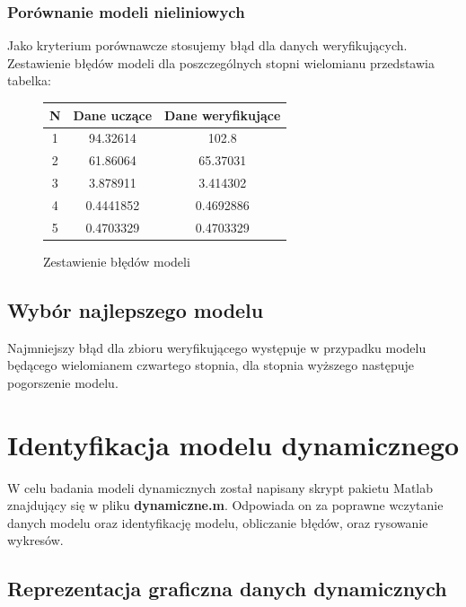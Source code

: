 \documentclass[a4paper, 11pt]{article}
\begin{document}
\subsubsection{Porównanie modeli nieliniowych}
Jako kryterium porównawcze stosujemy błąd dla danych weryfikujących. Zestawienie błędów modeli dla poszczególnych stopni wielomianu przedstawia tabelka: 
\begin{figure}[H]
\centering
\begin{tabular}{|c|c|c|}
\hline
	N & Dane uczące & Dane weryfikujące\\
\hline
	1 & 94.32614 & 102.8\\
\hline
	2 & 61.86064 & 65.37031\\
\hline
	3 & 3.878911 & 3.414302\\
\hline
	4 & 0.4441852 & 0.4692886\\
\hline
	5 & 0.4703329 & 0.4703329\\
\hline
\end{tabular}
\caption{Zestawienie błędów modeli}
\end{figure}

\subsection{Wybór najlepszego modelu}
Najmniejszy błąd dla zbioru weryfikującego występuje w przypadku modelu będącego wielomianem czwartego stopnia, dla stopnia wyższego następuje pogorszenie modelu.


\section{Identyfikacja modelu dynamicznego}
W celu badania modeli dynamicznych został napisany skrypt pakietu Matlab znajdujący się w pliku \textbf{dynamiczne.m}. 
Odpowiada on za poprawne wczytanie danych modelu oraz identyfikację modelu, obliczanie błędów, oraz rysowanie wykresów. 

\subsection{Reprezentacja graficzna danych dynamicznych}
\end{document}
